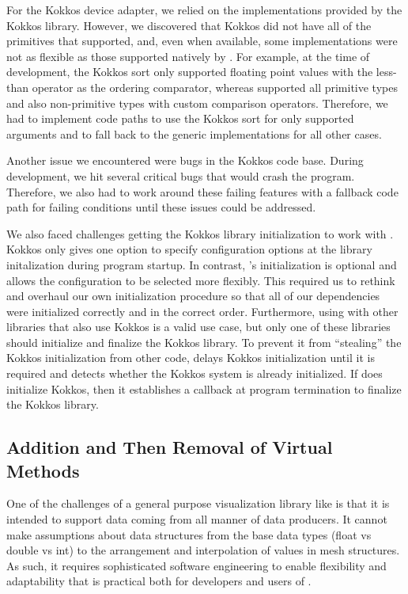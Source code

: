 For the Kokkos device adapter, we relied on the implementations provided by the Kokkos library.
However, we discovered that Kokkos did not have all of the primitives that \vtkm supported, and, even when available, some implementations were not as flexible as those supported natively by \vtkm.
For example, at the time of development, the Kokkos sort only supported floating point values with the less-than operator as the ordering comparator,
whereas \vtkm supported all primitive types and also non-primitive types with custom comparison operators.
Therefore, we had to implement code paths to use the Kokkos sort for only supported arguments and to fall back to the generic \vtkm implementations for all other cases.

Another issue we encountered were bugs in the Kokkos code base. During development, we hit several critical bugs that would crash the program. Therefore, we also had to work around these failing features with a fallback code path for failing conditions until these issues could be addressed.

We also faced challenges getting the Kokkos library initialization to work with \vtkm.
Kokkos only gives one option to specify configuration options at the library initalization during program startup.
In contrast, \vtkm's initialization is optional and allows the configuration to be selected more flexibly.
This required us to rethink and overhaul our own initialization procedure so that all of our dependencies were initialized correctly and in the correct order.
Furthermore, using \vtkm with other libraries that also use Kokkos is a valid use case, but only one of these libraries should initialize and finalize the Kokkos library.
To prevent it from ``stealing'' the Kokkos initialization from other code, \vtkm delays Kokkos initialization until it is required and detects whether the Kokkos system is already initialized.
If \vtkm does initialize Kokkos, then it establishes a callback at program termination to finalize the Kokkos library.

\subsection{Addition and Then Removal of Virtual Methods}
\label{sec:virtual-methods}


One of the challenges of a general purpose visualization library like \vtkm is that it is intended to support data coming from all manner of data producers.
It cannot make assumptions about data structures from the base data types (float vs double vs int) to the arrangement and interpolation of values in mesh structures.
As such, it requires sophisticated software engineering to enable flexibility and adaptability that is practical both for developers and users of \vtkm.


